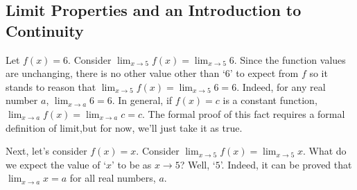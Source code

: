 \documentclass{ximera}
\begin{document}
\begin{example}
\begin{explanation}
\begin{image}
\end{image}
\end{explanation}
\end{example}





\subsection{Limit Properties and an Introduction to Continuity}
\label{LimitPropertiesandContinuity}

Let  $f(x) = 6$.  Consider $\lim_{x \rightarrow 5} f(x)  =  \lim_{x \rightarrow 5} 6$.   Since the function values are unchanging, there is no other value other than `$6$' to expect from $f$ so it stands to reason that $\lim_{x \rightarrow 5} f(x)  =  \lim_{x \rightarrow 5} 6 = 6$. Indeed, for any real number $a$,  $\lim_{x \rightarrow a} 6  = 6$.   In general, if $f(x) = c$ is a constant function, $\lim_{x \rightarrow a} f(x) =   \lim_{x \rightarrow a} c = c$.  The formal proof of this fact requires a formal definition of limit,but for now, we'll just take it as true.



Next, let's consider $f(x) = x$.  Consider $\lim_{x \rightarrow 5} f(x) = \lim_{x \rightarrow 5} x$. What do we expect the value of `$x$' to be as $x \rightarrow 5$?  Well, `$5$'.  Indeed, it can be proved that $\lim_{x \rightarrow a} x = a$ for all real numbers, $a$.
\end{document}

